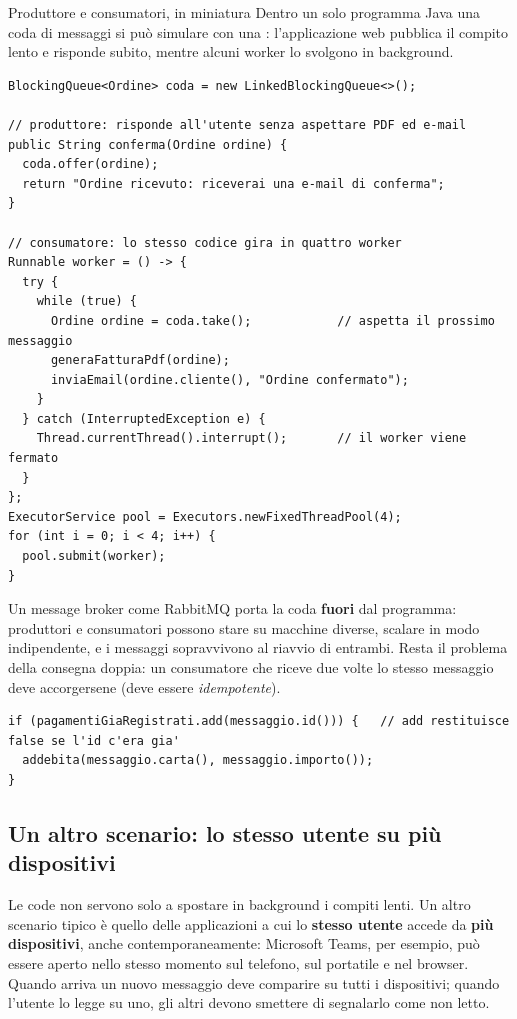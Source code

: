 \begin{esempio}{Produttore e consumatori, in miniatura}
Dentro un solo programma Java una coda di messaggi si può simulare con una : l'applicazione web
pubblica il compito lento e risponde subito, mentre alcuni worker lo svolgono in background.
\begin{lstlisting}[style=java, name=Ordini.java]
BlockingQueue<Ordine> coda = new LinkedBlockingQueue<>();

// produttore: risponde all'utente senza aspettare PDF ed e-mail
public String conferma(Ordine ordine) {
  coda.offer(ordine);
  return "Ordine ricevuto: riceverai una e-mail di conferma";
}

// consumatore: lo stesso codice gira in quattro worker
Runnable worker = () -> {
  try {
    while (true) {
      Ordine ordine = coda.take();            // aspetta il prossimo messaggio
      generaFatturaPdf(ordine);
      inviaEmail(ordine.cliente(), "Ordine confermato");
    }
  } catch (InterruptedException e) {
    Thread.currentThread().interrupt();       // il worker viene fermato
  }
};
ExecutorService pool = Executors.newFixedThreadPool(4);
for (int i = 0; i < 4; i++) {
  pool.submit(worker);
}
\end{lstlisting}
Un message broker come RabbitMQ porta la coda \textbf{fuori} dal programma: produttori e consumatori possono stare su
macchine diverse, scalare in modo indipendente, e i messaggi sopravvivono al riavvio di entrambi. Resta il problema della
consegna doppia: un consumatore che riceve due volte lo stesso messaggio deve accorgersene (deve essere
\textit{idempotente}).
\begin{lstlisting}[style=java, name=ConsumatorePagamenti.java]
if (pagamentiGiaRegistrati.add(messaggio.id())) {   // add restituisce false se l'id c'era gia'
  addebita(messaggio.carta(), messaggio.importo());
}
\end{lstlisting}
\end{esempio}

\subsection{Un altro scenario: lo stesso utente su più dispositivi}

Le code non servono solo a spostare in background i compiti lenti. Un altro scenario tipico è quello delle applicazioni a
cui lo \textbf{stesso utente} accede da \textbf{più dispositivi}, anche contemporaneamente: Microsoft Teams, per esempio,
può essere aperto nello stesso momento sul telefono, sul portatile e nel browser. Quando arriva un nuovo messaggio deve
comparire su tutti i dispositivi; quando l'utente lo legge su uno, gli altri devono smettere di segnalarlo come non letto.

